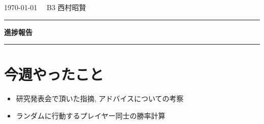 \documentclass{jarticle}     %
\begin{document}
  \noindent
  \onecolumn
  \hspace{1em}

  \today
  \hfill
  \ \  B3 西村昭賢 

  \vspace{2mm}
  \hrule
  \begin{center}
  {\Large \bf 進捗報告}
  \end{center}
  \hrule
  \vspace{3mm}


\section{今週やったこと}
\begin{itemize}
  \item 研究発表会で頂いた指摘, アドバイスについての考察
  \item ランダムに行動するプレイヤー同士の勝率計算
\end{itemize}
\end{document}
